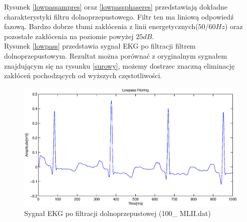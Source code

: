 \documentclass[a4paper, 11pt]{article}
\begin{document}
\newpage
Rysunek \eqref{lowpassampres} oraz \eqref{lowpassphaseres} przedstawiają dokładne charakterystyki filtru dolnoprzepustowego. Filtr ten ma liniową odpowiedź fazową. Bardzo dobrze tłumi zakłócenia z linii energetycznych($50/60Hz$) oraz pozostałe zakłócenia na poziomie powyżej $25dB$.\\
\indent Rysunek \eqref{lowpass} przedstawia sygnał EKG po filtracji filtrem dolnoprzepustowym. Rezultat można porównać z oryginalnym sygnałem znajdującym się na rysunku \eqref{surowy}, możemy dostrzec znaczną eliminację zakłóceń pochodzących od wyższych częstotliwości.
\begin{figure}[h]
\centering
\includegraphics[scale=0.5]{include/lowpass.eps}
\caption{Sygnał EKG po filtracji dolnoprzepustowej (100\_ MLII.dat)}
\label{lowpass}
\end{figure}\\
\end{document}
